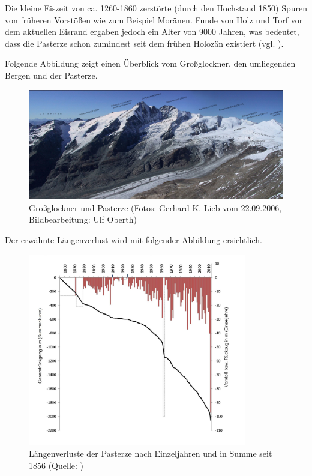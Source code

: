 \documentclass[12pt,a4paper]{article}
\begin{document}
Die kleine Eiszeit von ca. 1260-1860 zerstörte (durch den Hochstand 1850) Spuren von früheren Vorstößen wie zum Beispiel Moränen. Funde von Holz und Torf vor dem aktuellen Eisrand ergaben jedoch ein Alter von 9000 Jahren, was bedeutet, dass die Pasterze schon zumindest seit dem frühen Holozän existiert (vgl. \cite[24]{Pasterze}).

Folgende Abbildung zeigt einen Überblick vom Großglockner, den umliegenden Bergen und der Pasterze. 
\begin{figure}[H]
\centering
\includegraphics[width=1\textwidth]{pictures/Pasterze_Beschriftung_bw.jpg}
\caption[Großglockner und Pasterze]{Großglockner und Pasterze (Fotos: Gerhard K. Lieb vom 22.09.2006, Bildbearbeitung: Ulf Oberth)}
\label{fig:Grossglockner und Pasterze}
\end{figure}


Der erwähnte Längenverlust wird mit folgender Abbildung ersichtlich.

\begin{figure}[H]
\centering
\includegraphics[width=0.85\textwidth]{pictures/pasterze_laengenaenderung.jpg}
\caption[Längenverluste der Pasterze nach Einzeljahren und in Summe seit 1856]{Längenverluste der Pasterze nach Einzeljahren und in Summe seit 1856  (Quelle:  \cite{LaengenaenderungPasterze})}
\label{fig:Längenverluste der Pasterze}
\end{figure}
\end{document}
